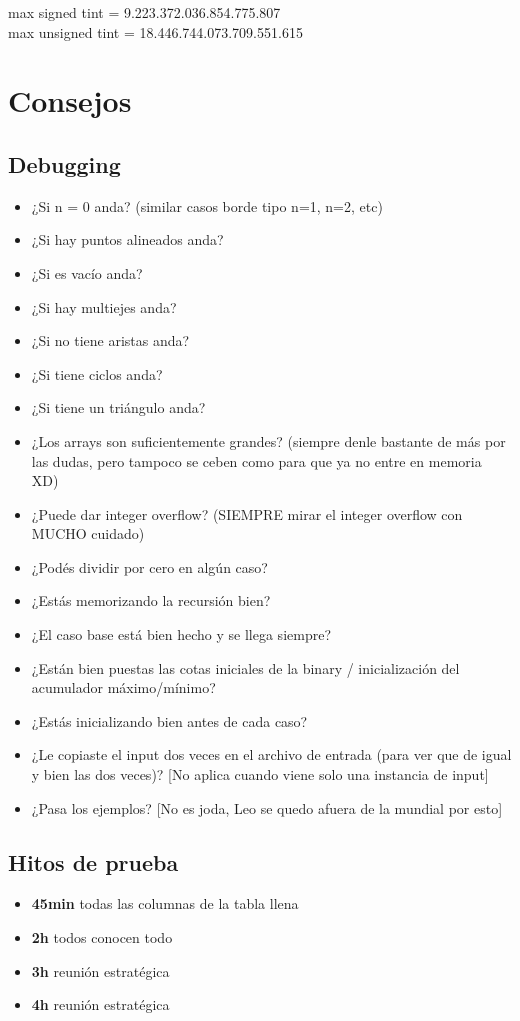 \documentclass{article}
\begin{document}
\begin{multicols*}{2}
max signed tint = 9.223.372.036.854.775.807 \\
max unsigned tint = 18.446.744.073.709.551.615


\section{Consejos}
\subsection{Debugging}
\begin{itemize}
    \itemsep0em
\item ¿Si n = 0 anda? (similar casos borde tipo n=1, n=2, etc)
\item ¿Si hay puntos alineados anda?
\item ¿Si es vacío anda?
\item ¿Si hay multiejes anda?
\item ¿Si no tiene aristas anda?
\item ¿Si tiene ciclos anda?
\item ¿Si tiene un triángulo anda?

\item ¿Los arrays son suficientemente grandes? (siempre denle bastante de más por las dudas, pero tampoco se ceben como para que ya no entre en memoria XD)
\item ¿Puede dar integer overflow? (SIEMPRE mirar el integer overflow con MUCHO cuidado)
\item ¿Podés dividir por cero en algún caso?
\item ¿Estás memorizando la recursión bien?
\item ¿El caso base está bien hecho y se llega siempre?
\item ¿Están bien puestas las cotas iniciales de la binary / inicialización del acumulador máximo/mínimo?

\item ¿Estás inicializando bien antes de cada caso?
\item ¿Le copiaste el input dos veces en el archivo de entrada (para ver que de igual y bien las dos veces)? [No aplica cuando viene solo una instancia de input]
\item ¿Pasa los ejemplos? [No es joda, Leo se quedo afuera de la mundial por esto]
\end{itemize}
\subsection{Hitos de prueba}
\begin{itemize}
    \item \textbf{45min} todas las columnas de la tabla llena
    \item \textbf{2h} todos conocen todo
    \item \textbf{3h} reunión estratégica
    \item \textbf{4h} reunión estratégica   
\end{itemize}
\end{multicols*}
\end{document}
